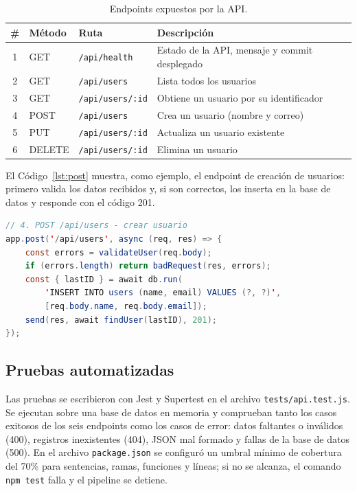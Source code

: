 \documentclass[12pt,letterpaper]{article}
\begin{document}
\begin{table}[H]
  \centering
  \caption{Endpoints expuestos por la API.}
  \label{tab:endpoints}
  \begin{tabularx}{\textwidth}{c l l X}
    \toprule
    \# & Método & Ruta & Descripción \\
    \midrule
    1 & GET    & \texttt{/api/health}    & Estado de la API, mensaje y commit desplegado \\
    2 & GET    & \texttt{/api/users}     & Lista todos los usuarios \\
    3 & GET    & \texttt{/api/users/:id} & Obtiene un usuario por su identificador \\
    4 & POST   & \texttt{/api/users}     & Crea un usuario (nombre y correo) \\
    5 & PUT    & \texttt{/api/users/:id} & Actualiza un usuario existente \\
    6 & DELETE & \texttt{/api/users/:id} & Elimina un usuario \\
    \bottomrule
  \end{tabularx}
\end{table}

El Código~\ref{lst:post} muestra, como ejemplo, el endpoint de creación de usuarios: primero valida los datos recibidos y, si son correctos, los inserta en la base de datos y responde con el código 201.

\begin{lstlisting}[language=Java, caption={Endpoint POST /api/users (\texttt{src/app.js}).}, label={lst:post}]
// 4. POST /api/users - crear usuario
app.post('/api/users', async (req, res) => {
    const errors = validateUser(req.body);
    if (errors.length) return badRequest(res, errors);
    const { lastID } = await db.run(
        'INSERT INTO users (name, email) VALUES (?, ?)',
        [req.body.name, req.body.email]);
    send(res, await findUser(lastID), 201);
});
\end{lstlisting}

\subsection{Pruebas automatizadas}

Las pruebas se escribieron con Jest y Supertest en el archivo \texttt{tests/api.test.js}. Se ejecutan sobre una base de datos en memoria y comprueban tanto los casos exitosos de los seis endpoints como los casos de error: datos faltantes o inválidos (400), registros inexistentes (404), JSON mal formado y fallas de la base de datos (500). En el archivo \texttt{package.json} se configuró un umbral mínimo de cobertura del 70\% para sentencias, ramas, funciones y líneas; si no se alcanza, el comando \texttt{npm test} falla y el pipeline se detiene.
\end{document}
